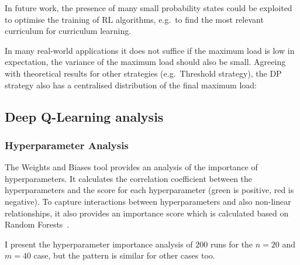 In future work, the presence of many small probability states could be exploited to optimise the training of RL algorithms, e.g.\ to find the most relevant curriculum for curriculum learning. 


In many real-world applications it does not suffice if the maximum load is low in expectation, the variance of the maximum load should also be small. Agreeing with theoretical results for other strategies (e.g.\ Threshold strategy), the DP strategy also has a centralised distribution of the final maximum load:






\subsection{Deep Q-Learning analysis}






\subsubsection{Hyperparameter Analysis}



The Weights and Biases tool provides an analysis of the importance of hyperparameters. It calculates the correlation coefficient between the hyperparameters and the score for each hyperparameter (green is positive, red is negative). To capture interactions between hyperparameters and also non-linear relationships, it also provides an importance score which is calculated based on Random Forests~\cite{biewald2020wandb}.


I present the hyperparameter importance analysis of $200$ runs for the $n=20$ and $m=40$ case, but the pattern is similar for other cases too.


